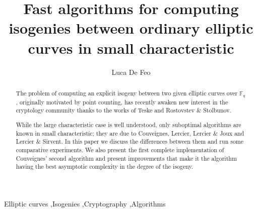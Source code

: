 \documentclass[preprint,1p]{elsarticle}
\newcommand{\F}{\mathbb{F}}  %
\newcommand{\0}{\mathcal{O}}  %
\begin{document}
\begin{frontmatter}

\title{Fast algorithms for computing isogenies between ordinary
  elliptic curves in small characteristic}
\author{Luca De Feo}
\address{LIX, {\'E}cole Polytechnique, 91128 Palaiseau, France}


\begin{abstract}
  The problem of computing an explicit isogeny between two given
  elliptic curves over $\F_q$, originally motivated by point counting,
  has recently awaken new interest in the cryptology community thanks
  to the works of Teske and Rostovstev \& Stolbunov.

  While the large characteristic case is well understood, only
  suboptimal algorithms are known in small characteristic; they are
  due to Couveignes, Lercier, Lercier \& Joux and Lercier \& Sirvent.
  In this paper we discuss the differences between them and run some
  comparative experiments. We also present the first complete
  implementation of Couveignes' second algorithm and present
  improvements that make it the algorithm having the best asymptotic
  complexity in the degree of the isogeny.
\end{abstract}

\begin{keyword}
  Elliptic curves \sep Isogenies \sep Cryptography \sep Algorithms
\end{keyword}

\end{frontmatter}










\end{document}

